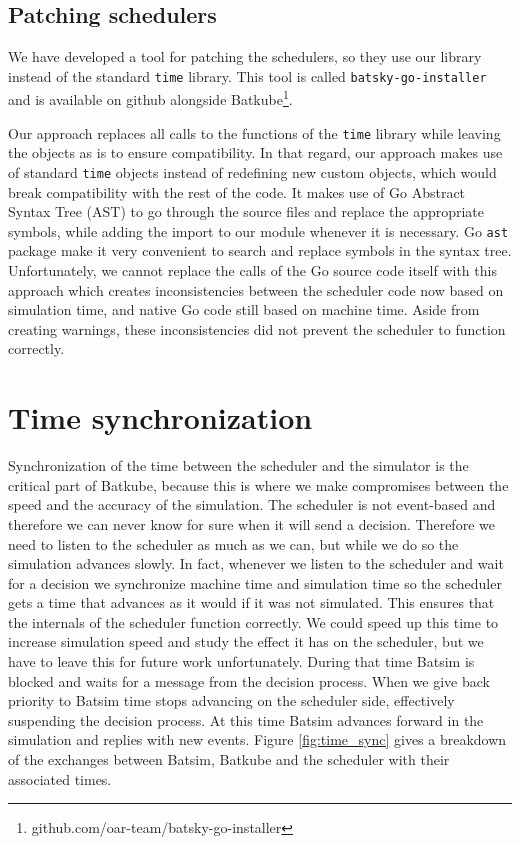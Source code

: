 \subsection{Patching schedulers} \label{sec:patch-scheds}

We have developed a tool for patching the schedulers, so they use our library
instead of the standard \texttt{time} library. This tool is called
\texttt{batsky-go-installer} and is available on github alongside
Batkube\footnote{github.com/oar-team/batsky-go-installer}.

Our approach replaces all calls to the functions of the \texttt{time} library
while leaving the objects as is to ensure compatibility. In that regard, our
approach makes use of standard \texttt{time} objects instead of redefining new
custom objects, which would break compatibility with the rest of the code. It
makes use of Go Abstract Syntax Tree (AST) to go through the source files and
replace the appropriate symbols, while adding the import to our module whenever
it is necessary. Go \texttt{ast} package make it very convenient to search and
replace symbols in the syntax tree.  Unfortunately, we cannot replace the calls
of the Go source code itself with this approach which creates inconsistencies
between the scheduler code now based on simulation time, and native Go code
still based on machine time. Aside from creating warnings, these
inconsistencies did not prevent the scheduler to function correctly.

\section{Time synchronization}

Synchronization of the time between the scheduler and the simulator is the
critical part of Batkube, because this is where we make compromises between the
speed and the accuracy of the simulation. The scheduler is not event-based and
therefore we can never know for sure when it will send a decision. Therefore we
need to listen to the scheduler as much as we can, but while we do so the
simulation advances slowly. In fact, whenever we listen to the scheduler and
wait for a decision we synchronize machine time and simulation time so the
scheduler gets a time that advances as it would if it was not simulated. This
ensures that the internals of the scheduler function correctly. We could speed
up this time to increase simulation speed and study the effect it has on the
scheduler, but we have to leave this for future work unfortunately. During that
time Batsim is blocked and waits for a message from the decision process. When
we give back priority to Batsim time stops advancing on the scheduler side,
effectively suspending the decision process. At this time Batsim advances
forward in the simulation and replies with new events. Figure
\ref{fig:time_sync} gives a breakdown of the exchanges between Batsim, Batkube
and the scheduler with their associated times.\\

